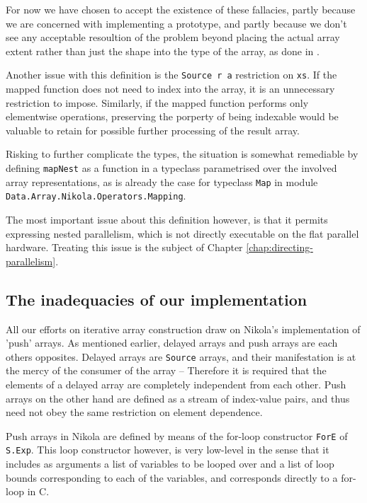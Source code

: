 For now we have chosen to accept the existence of these fallacies,
partly because we are concerned with implementing a prototype, and
partly because we don't see any acceptable resoultion of the problem
beyond placing the actual array extent rather than just the shape into
the type of the array, as done in \cite{thiemannagda}.

Another issue with this definition is the \texttt{Source r a} restriction on
\texttt{xs}. If the mapped function does not need to index into the array, it
is an unnecessary restriction to impose.  Similarly, if the mapped function
performs only elementwise operations, preserving the porperty of being
indexable would be valuable to retain for possible further processing of the
result array.

Risking to further complicate the types, the situation is somewhat remediable
by defining \texttt{mapNest} as a function in a typeclass parametrised over the
involved array representations, as is already the case for typeclass
\texttt{Map} in module \texttt{Data.Array.Nikola.Operators.Mapping}.

The most important issue about this definition however, is that it permits
expressing nested parallelism, which is not directly executable on the flat
parallel hardware. Treating this issue is the subject of Chapter
\ref{chap:directing-parallelism}.

\subsection{The inadequacies of our implementation}

All our efforts on iterative array construction draw on Nikola's implementation
of 'push' arrays. As mentioned earlier, delayed arrays and push arrays are each
others opposites. Delayed arrays are \texttt{Source} arrays, and their
manifestation is at the mercy of the consumer of the array -- Therefore it is
required that the elements of a delayed array are completely independent from
each other.  Push arrays on the other hand are defined as a stream of
index-value pairs, and thus need not obey the same restriction on element
dependence.

Push arrays in Nikola are defined by means of the for-loop constructor
\texttt{ForE} of \texttt{S.Exp}. This loop constructor however, is very
low-level in the sense that it includes as arguments a list of variables to be
looped over and a list of loop bounds corresponding to each of the variables,
and corresponds directly to a for-loop in C.

